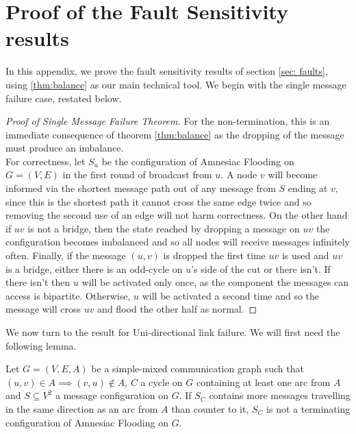 
\section{Proof of the Fault Sensitivity results}
\label{apx: faults}

In this appendix, we prove the fault sensitivity results of section \cref{sec: faults}, using \cref{thm:balance} as our main technical tool.
We begin with the single message failure case, restated below.

\begin{proof}[Proof of Single Message Failure Theorem]
    For the non-termination, this is an immediate consequence of theorem \ref{thm:balance} as the dropping of the message must produce an imbalance.\\
    For correctness, let $S_u$ be the configuration of Amnesiac Flooding on $G=(V,E)$ in the first round of broadcast from $u$. 
    A node $v$ will become informed via the shortest message path out of any message from $S$ ending at $v$, since this is the shortest path it cannot cross the same edge twice and so removing the second use of an edge will not harm correctness. 
    On the other hand if $uv$ is not a bridge, then the state reached by dropping a message on $uv$ the configuration becomes imbalanced and so all nodes will receive messages infinitely often. 
    Finally, if the message $(u,v)$ is dropped the first time $uv$ is used and $uv$ is a bridge, either there is an odd-cycle on $u$'s side of the cut or there isn't. 
    If there isn't then $u$ will be activated only once, as the component the messages can access is bipartite. 
    Otherwise, $u$ will be activated a second time and so the message will cross $uv$ and flood the other half as normal.
\end{proof}
We now turn to the result for Uni-directional link failure.
We will first need the following lemma.
\begin{lemma}\label{lemma: directed}
    Let $G=(V,E,A)$ be a simple-mixed communication graph such that $(u,v) \in A \implies (v,u) \notin A$, $C$ a cycle on $G$ containing at least one arc from $A$ and $S\subseteq V^2$ a message configuration on $G$. If $S_C$ contains more messages travelling in the same direction as an arc from $A$ than counter to it, $S_C$ is not a terminating configuration of Amnesiac Flooding on $G$.
\end{lemma}
